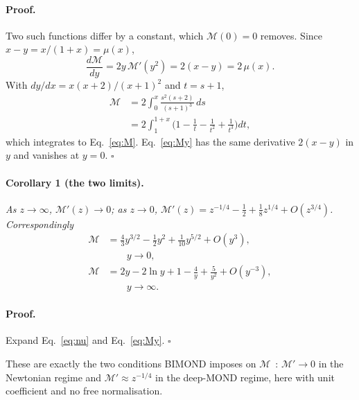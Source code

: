 \documentclass[twocolumn]{iopjournal}
\begin{document}
\paragraph{Proof.} Two such functions differ by a constant, which
$\mathcal{M}(0) = 0$ removes. Since $x - y = x/(1+x) = \mu(x)$,
\begin{equation}
  \frac{d\mathcal{M}}{dy} = 2y\,\mathcal{M}'(y^2) = 2(x - y)
  = 2\,\mu(x).
  \label{eq:dM}
\end{equation}
With $dy/dx = x(x+2)/(x+1)^2$ and $t = s + 1$,
\begin{equation}
\begin{aligned}
  \mathcal{M} &= 2\int_0^x \frac{s^2(s+2)}{(s+1)^3}\,ds \\
  &= 2\int_1^{1+x}\Big(1 - \frac1t - \frac1{t^2} + \frac1{t^3}\Big)dt,
\end{aligned}
\end{equation}
which integrates to Eq.~\eqref{eq:M}. Eq.~\eqref{eq:My} has the same
derivative $2(x - y)$ in $y$ and vanishes at $y = 0$.
\hfill $\square$

\paragraph{Corollary 1 (the two limits).} \textit{As $z \to \infty$,
$\mathcal{M}'(z) \to 0$; as $z \to 0$,
$\mathcal{M}'(z) = z^{-1/4} - \tfrac12 + \tfrac18 z^{1/4} + O(z^{3/4})$.
Correspondingly}
\begin{equation}
\begin{aligned}
  \mathcal{M} &= \tfrac43 y^{3/2} - \tfrac12 y^2 + \tfrac1{10}y^{5/2}
     + O(y^3),\\
     &\qquad y \to 0,\\
  \mathcal{M} &= 2y - 2\ln y + 1 - \frac4y + \frac5{y^2} + O(y^{-3}),\\
     &\qquad y \to \infty .
\end{aligned}
  \label{eq:limits}
\end{equation}

\paragraph{Proof.} Expand Eq.~\eqref{eq:nu} and Eq.~\eqref{eq:My}.
\hfill $\square$

\medskip
\noindent
These are exactly the two conditions BIMOND imposes on
$\mathcal{M}$~\cite{Milgrom2009}: $\mathcal{M}' \to 0$ in the
Newtonian regime and $\mathcal{M}' \approx z^{-1/4}$ in the deep-MOND
regime, here with unit coefficient and no free normalisation.
\end{document}
